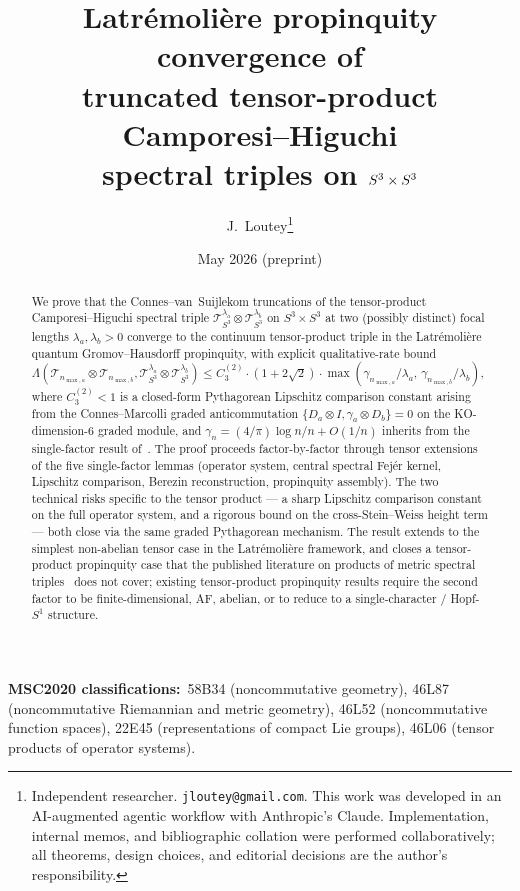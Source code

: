 \documentclass[11pt,a4paper]{article}
\title{Latr\'emoli\`ere propinquity convergence of \\
truncated tensor-product Camporesi--Higuchi \\
spectral triples on $\sthree \times \sthree$}
\author{J.~Loutey\thanks{Independent researcher. \texttt{jloutey@gmail.com}.
This work was developed in an AI-augmented agentic workflow with
Anthropic's Claude. Implementation, internal memos, and bibliographic
collation were performed collaboratively; all theorems, design choices,
and editorial decisions are the author's responsibility.}}
\date{May 2026 (preprint)}
\theoremstyle{plain}
\theoremstyle{definition}
\newcommand{\nmaxa}{n_{\max,a}}
\newcommand{\nmaxb}{n_{\max,b}}
\newcommand{\sthree}{S^{3}}
\newcommand{\Tcal}{\mathcal{T}}
\begin{document}
\maketitle

\begin{abstract}
We prove that the Connes--van~Suijlekom truncations of the
tensor-product Camporesi--Higuchi spectral triple
$\Tcal_{\sthree}^{\lambda_a} \otimes \Tcal_{\sthree}^{\lambda_b}$ on
$\sthree \times \sthree$ at two (possibly distinct) focal lengths
$\lambda_a, \lambda_b > 0$ converge to the continuum tensor-product
triple in the Latr\'emoli\`ere quantum Gromov--Hausdorff propinquity,
with explicit qualitative-rate bound
\(
   \Lambda(\Tcal_{\nmaxa} \otimes \Tcal_{\nmaxb},
            \Tcal_{\sthree}^{\lambda_a} \otimes \Tcal_{\sthree}^{\lambda_b})
   \le C_3^{(2)} \cdot (1 + 2\sqrt{2}) \cdot
        \max(\gamma_{\nmaxa}/\lambda_a,\, \gamma_{\nmaxb}/\lambda_b),
\)
where $C_3^{(2)} < 1$ is a closed-form Pythagorean Lipschitz comparison
constant arising from the Connes--Marcolli graded anticommutation
$\{D_a \otimes I, \gamma_a \otimes D_b\} = 0$ on the KO-dimension-6
graded module, and $\gamma_n = (4/\pi)\log n / n + O(1/n)$ inherits
from the single-factor result of~\cite{loutey_paper38}. The proof
proceeds factor-by-factor through tensor extensions of the five
single-factor lemmas (operator system, central spectral Fej\'er kernel,
Lipschitz comparison, Berezin reconstruction, propinquity assembly).
The two technical risks specific to the tensor product --- a sharp
Lipschitz comparison constant on the full operator system, and a
rigorous bound on the cross-Stein--Weiss height term --- both close
via the same graded Pythagorean mechanism. The result extends
\cite{connes_vs2021,leimbach_vs2024,loutey_paper38} to the simplest
non-abelian tensor case in the Latr\'emoli\`ere framework, and closes
a tensor-product propinquity case that the published literature on
products of metric spectral triples~\cite{latremoliere2026,
farsi_latremoliere2024,farsi_latremoliere2025,aguilar2019} does not
cover; existing tensor-product propinquity results require the second
factor to be finite-dimensional, AF, abelian, or to reduce to a
single-character / Hopf-$S^1$ structure.
\end{abstract}

\bigskip\noindent
\textbf{MSC2020 classifications:}\ 58B34 (noncommutative geometry),
46L87 (noncommutative Riemannian and metric geometry),
46L52 (noncommutative function spaces),
22E45 (representations of compact Lie groups),
46L06 (tensor products of operator systems).
\end{document}
